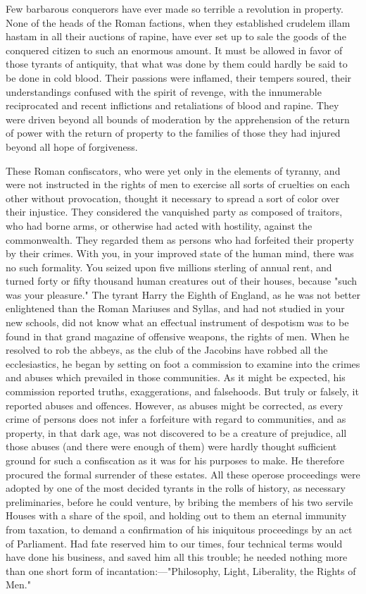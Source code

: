 Few barbarous conquerors have ever made so terrible a revolution in property. None of the heads of the Roman factions, when they established crudelem illam hastam in all their auctions of rapine, have ever set up to sale the goods of the conquered citizen to such an enormous amount. It must be allowed in favor of those tyrants of antiquity, that what was done by them could hardly be said to be done in cold blood. Their passions were inflamed, their tempers soured, their understandings confused with the spirit of revenge, with the innumerable reciprocated and recent inflictions and retaliations of blood and rapine. They were driven beyond all bounds of moderation by the apprehension of the return of power with the return of property to the families of those they had injured beyond all hope of forgiveness.

These Roman confiscators, who were yet only in the elements of tyranny, and were not instructed in the rights of men to exercise all sorts of cruelties on each other without provocation, thought it necessary to spread a sort of color over their injustice. They considered the vanquished party as composed of traitors, who had borne arms, or otherwise had acted with hostility, against the commonwealth. They regarded them as persons who had forfeited their property by their crimes. With you, in your improved state of the human mind, there was no such formality. You seized upon five millions sterling of annual rent, and turned forty or fifty thousand human creatures out of their houses, because "such was your pleasure." The tyrant Harry the Eighth of England, as he was not better enlightened than the Roman Mariuses and Syllas, and had not studied in your new schools, did not know what an effectual instrument of despotism was to be found in that grand magazine of offensive weapons, the rights of men. When he resolved to rob the abbeys, as the club of the Jacobins have robbed all the ecclesiastics, he began by setting on foot a commission to examine into the crimes and abuses which prevailed in those communities. As it might be expected, his commission reported truths, exaggerations, and falsehoods. But truly or falsely, it reported abuses and offences. However, as abuses might be corrected, as every crime of persons does not infer a forfeiture with regard to communities, and as property, in that dark age, was not discovered to be a creature of prejudice, all those abuses (and there were enough of them) were hardly thought sufficient ground for such a confiscation as it was for his purposes to make. He therefore procured the formal surrender of these estates. All these operose proceedings were adopted by one of the most decided tyrants in the rolls of history, as necessary preliminaries, before he could venture, by bribing the members of his two servile Houses with a share of the spoil, and holding out to them an eternal immunity from taxation, to demand a confirmation of his iniquitous proceedings by an act of Parliament. Had fate reserved him to our times, four technical terms would have done his business, and saved him all this trouble; he needed nothing more than one short form of incantation:—"Philosophy, Light, Liberality, the Rights of Men."

